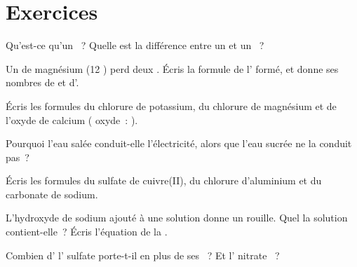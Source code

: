\section{Exercices}

\begin{exercise}[$\star$]\label{exo:g9:ions:1}
Qu'est-ce qu'un ~? Quelle est la différence entre un  et un
~?
\end{exercise}

\begin{exercise}[$\star$]\label{exo:g9:ions:2}
Un  de magnésium (12 ) perd deux . Écris la
formule de l' formé, et donne ses nombres de  et d'.
\end{exercise}

\begin{exercise}[$\star$]\label{exo:g9:ions:3}
Écris les formules du chlorure de potassium, du chlorure de magnésium et
de l'oxyde de calcium ( oxyde~: ).
\end{exercise}

\begin{exercise}[$\star$]\label{exo:g9:ions:4}
Pourquoi l'eau salée conduit-elle l'électricité, alors que l'eau sucrée
ne la conduit pas~?
\end{exercise}

\begin{exercise}[$\star\star$]\label{exo:g9:ions:5}
Écris les formules du sulfate de cuivre(II), du chlorure d'aluminium et
du carbonate de sodium.
\end{exercise}

\begin{exercise}[$\star\star$]\label{exo:g9:ions:6}
L'hydroxyde de sodium ajouté à une solution donne un  rouille.
Quel  la solution contient-elle~? Écris l'équation de la
.
\end{exercise}

\begin{exercise}[$\star\star$]\label{exo:g9:ions:7}
Combien d' l' sulfate  porte-t-il en plus de
ses ~? Et l' nitrate ~?
\end{exercise}

